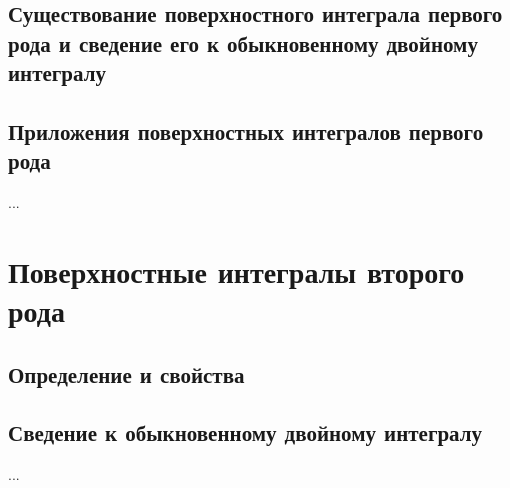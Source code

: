 \subsection{Существование поверхностного интеграла первого рода и сведение его к обыкновенному двойному интегралу}
\subsection{Приложения поверхностных интегралов первого рода}
...

\section{Поверхностные интегралы второго рода}
\subsection{Определение и свойства}
\subsection{Сведение к обыкновенному двойному интегралу}
...


